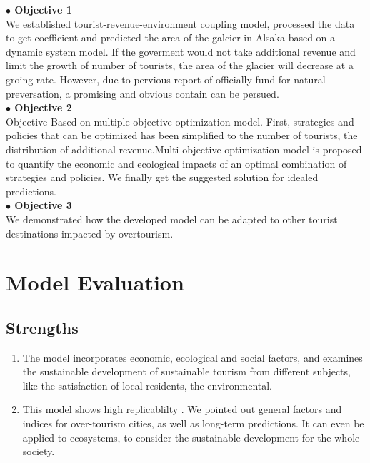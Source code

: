 \documentclass[UTF8]{mcmthesis}
\begin{document}
 \textbf{$\bullet$ Objective 1}\\ 
            \hspace*{2em} We established tourist-revenue-environment coupling model, processed the data to get coefficient and predicted the area of the galcier in Alsaka based on a dynamic system model.
            If the goverment would not take additional revenue and limit the growth of number of tourists, the area of the glacier will decrease at a groing rate. However, due to pervious report of officially fund for natural preversation, a promising and obvious contain can be persued.\\
   \textbf{$\bullet$ Objective 2}\\ \hspace*{2em} Objective Based on multiple objective optimization model. First, strategies and policies that can be optimized has been simplified to the number of tourists, the distribution of additional revenue.Multi-objective optimization model is proposed to quantify the economic and ecological impacts of an optimal combination of strategies and policies.
            We finally get the suggested solution for idealed predictions.\\
     \textbf{$\bullet$ Objective 3}\\
            \hspace*{2em} We demonstrated how the developed model can be adapted to other tourist destinations impacted by overtourism.
            

    \section{Model Evaluation}
        \subsection{Strengths}
        \begin{enumerate}
\item The model incorporates economic, ecological and social factors, and examines the  sustainable development of sustainable tourism from different subjects, like the satisfaction of local residents, the environmental.
																																																																																				
\item This model shows high replicablilty . We pointed out general factors and indices for over-tourism cities, as well as long-term predictions. It can even be applied to ecosystems, to consider the sustainable development for the whole society.
\end{enumerate}
\end{document}
